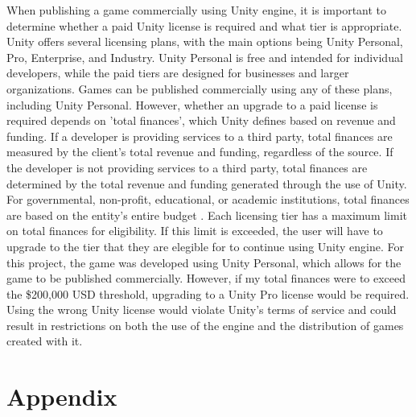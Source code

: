 \documentclass[]{final_report}
\begin{document}
When publishing a game commercially using Unity engine, it is important to determine whether a paid Unity license is required and what tier is appropriate. Unity offers several licensing plans, with the main options being Unity Personal, Pro, Enterprise, and Industry. Unity Personal is free and intended for individual developers, while the paid tiers are designed for businesses and larger organizations.
Games can be published commercially using any of these plans, including Unity Personal. However, whether an upgrade to a paid license is required depends on 'total finances', which Unity defines based on revenue and funding. If a developer is providing services to a third party, total finances are measured by the client’s total revenue and funding, regardless of the source. If the developer is not providing services to a third party, total finances are determined by the total revenue and funding generated through the use of Unity. For governmental, non-profit, educational, or academic institutions, total finances are based on the entity’s entire budget \cite{UnityTC}.
Each licensing tier has a maximum limit on total finances for eligibility. If this limit is exceeded, the user will have to upgrade to the tier that they are elegible for to continue using Unity engine. For this project, the game was developed using Unity Personal, which allows for the game to be published commercially. However, if my total finances were to exceed the \$200,000 USD threshold, upgrading to a Unity Pro license would be required. Using the wrong Unity license would violate Unity's terms of service and could result in restrictions on both the use of the engine and the distribution of games created with it.






\color{black}

\appendix
\chapter{Appendix}
\end{document}
